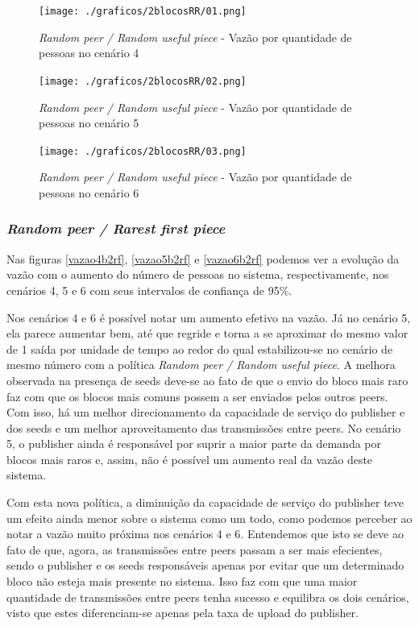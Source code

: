 \documentclass[a4paper,10pt]{article}
\begin{document}
\pagebreak

\begin{figure}
	\caption{\textit{Random peer / Random useful piece} - Vazão por quantidade de pessoas no cenário 4}
	\label{vazao4b2rr}
	\texttt{[image: ./graficos/2blocosRR/01.png]}
\end{figure}

\begin{figure}
	\caption{\textit{Random peer / Random useful piece} - Vazão por quantidade de pessoas no cenário 5}
	\label{vazao5b2rr}
	\texttt{[image: ./graficos/2blocosRR/02.png]}
\end{figure}

\clearpage
\pagebreak

\begin{figure}
	\caption{\textit{Random peer / Random useful piece} - Vazão por quantidade de pessoas no cenário 6}
	\label{vazao6b2rr}
	\texttt{[image: ./graficos/2blocosRR/03.png]}
\end{figure}

\pagebreak

\subsubsection{\textit{Random peer / Rarest first piece}}

Nas figuras \ref{vazao4b2rf}, \ref{vazao5b2rf} e \ref{vazao6b2rf} podemos ver a evolução da vazão com o aumento do número de pessoas no sistema, respectivamente, nos cenários 4, 5 e 6 com seus intervalos de confiança de 95\%.

Nos cenários 4 e 6 é possível notar um aumento efetivo na vazão. Já no cenário 5, ela parece aumentar bem, até que regride e torna a se aproximar do mesmo valor de 1 saída por unidade de tempo ao redor do qual estabilizou-se no cenário de mesmo número com a política \textit{Random peer / Random useful piece}. A melhora observada na presença de seeds deve-se ao fato de que o envio do bloco mais raro faz com que os blocos mais comuns possem a ser enviados pelos outros peers. Com isso, há um melhor direcionamento da capacidade de serviço do publisher e dos seeds e um melhor aproveitamento das transmissões entre peers. No cenário 5, o publisher ainda é responsável por suprir a maior parte da demanda por blocos mais raros e, assim, não é possível um aumento real da vazão deste sistema.

Com esta nova política, a diminuição da capacidade de serviço do publisher teve um efeito ainda menor sobre o sistema como um todo, como podemos perceber ao notar a vazão muito próxima nos cenários 4 e 6. Entendemos que isto se deve ao fato de que, agora, as transmissões entre peers passam a ser mais efecientes, sendo o publisher e os seeds responsáveis apenas por evitar que um determinado bloco não esteja mais presente no sistema. Isso faz com que uma maior quantidade de transmissões entre peers tenha sucesso e equilibra os dois cenários, visto que estes diferenciam-se apenas pela taxa de upload do publisher.
\end{document}
